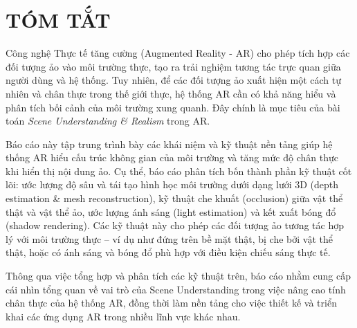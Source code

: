 \newpage
\section*{TÓM TẮT}

Công nghệ Thực tế tăng cường (Augmented Reality - AR) cho phép tích hợp các đối tượng ảo vào môi trường thực, tạo ra trải nghiệm tương tác trực quan giữa người dùng và hệ thống. Tuy nhiên, để các đối tượng ảo xuất hiện một cách tự nhiên và chân thực trong thế giới thực, hệ thống AR cần có khả năng hiểu và phân tích bối cảnh của môi trường xung quanh. Đây chính là mục tiêu của bài toán \textit{Scene Understanding \& Realism} trong AR.

Báo cáo này tập trung trình bày các khái niệm và kỹ thuật nền tảng giúp hệ thống AR hiểu cấu trúc không gian của môi trường và tăng mức độ chân thực khi hiển thị nội dung ảo. Cụ thể, báo cáo phân tích bốn thành phần kỹ thuật cốt lõi: ước lượng độ sâu và tái tạo hình học môi trường dưới dạng lưới 3D (depth estimation \& mesh reconstruction), kỹ thuật che khuất (occlusion) giữa vật thể thật và vật thể ảo, ước lượng ánh sáng (light estimation) và kết xuất bóng đổ (shadow rendering). Các kỹ thuật này cho phép các đối tượng ảo tương tác hợp lý với môi trường thực -- ví dụ như đứng trên bề mặt thật, bị che bởi vật thể thật, hoặc có ánh sáng và bóng đổ phù hợp với điều kiện chiếu sáng thực tế.

Thông qua việc tổng hợp và phân tích các kỹ thuật trên, báo cáo nhằm cung cấp cái nhìn tổng quan về vai trò của Scene Understanding trong việc nâng cao tính chân thực của hệ thống AR, đồng thời làm nền tảng cho việc thiết kế và triển khai các ứng dụng AR trong nhiều lĩnh vực khác nhau.

\newpage